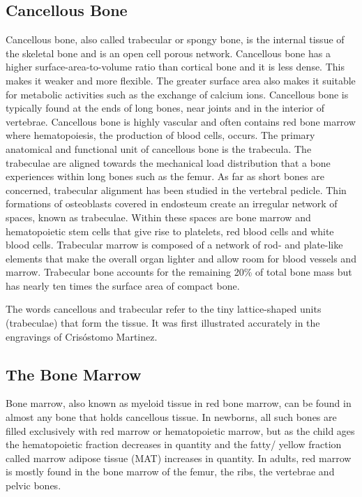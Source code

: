 \hypertarget{cancellous-bone}{%
\subsection{Cancellous Bone}\label{cancellous-bone}}

Cancellous bone, also called trabecular or spongy bone, is the internal tissue of the skeletal bone and is an open cell porous network. Cancellous bone has a higher surface-area-to-volume ratio than cortical bone and it is less dense. This makes it weaker and more flexible. The greater surface area also makes it suitable for metabolic activities such as the exchange of calcium ions. Cancellous bone is typically found at the ends of long bones, near joints and in the interior of vertebrae. Cancellous bone is highly vascular and often contains red bone marrow where hematopoiesis, the production of blood cells, occurs. The primary anatomical and functional unit of cancellous bone is the trabecula. The trabeculae are aligned towards the mechanical load distribution that a bone experiences within long bones such as the femur. As far as short bones are concerned, trabecular alignment has been studied in the vertebral pedicle. Thin formations of osteoblasts covered in endosteum create an irregular network of spaces, known as trabeculae. Within these spaces are bone marrow and hematopoietic stem cells that give rise to platelets, red blood cells and white blood cells. Trabecular marrow is composed of a network of rod- and plate-like elements that make the overall organ lighter and allow room for blood vessels and marrow. Trabecular bone accounts for the remaining 20\% of total bone mass but has nearly ten times the surface area of compact bone.

The words cancellous and trabecular refer to the tiny lattice-shaped units (trabeculae) that form the tissue. It was first illustrated accurately in the engravings of Crisóstomo Martinez.

\hypertarget{the-bone-marrow-1}{%
\subsection{The Bone Marrow}\label{the-bone-marrow-1}}

Bone marrow, also known as myeloid tissue in red bone marrow, can be found in almost any bone that holds cancellous tissue. In newborns, all such bones are filled exclusively with red marrow or hematopoietic marrow, but as the child ages the hematopoietic fraction decreases in quantity and the fatty/ yellow fraction called marrow adipose tissue (MAT) increases in quantity. In adults, red marrow is mostly found in the bone marrow of the femur, the ribs, the vertebrae and pelvic bones.

